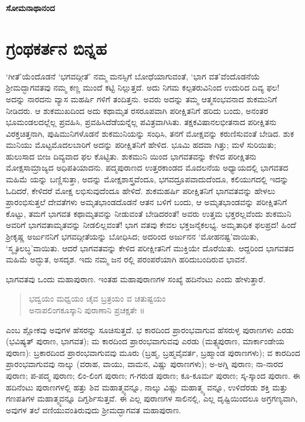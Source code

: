 \begin{flushright}
\textbf{ಸೋಮನಾಥಾನಂದ}
\end{flushright}

\chapter*{ಗ್ರಂಥಕರ್ತನ ಬಿನ್ನಹ}

‘ಗೀತೆ’ಯೆಂದೊಡನೆ ‘ಭಗವದ್ಗೀತೆ’ ನಮ್ಮ ಮನಸ್ಸಿಗೆ ಬೋಧೆಯಾಗುವಂತೆ, ‘ಭಾಗ ವತ’ವೆಂದೊಡನೆಯೆ ಶ್ರೀಮದ್ಭಾಗವತವು ನಮ್ಮ ಕಣ್ಣ ಮುಂದೆ ಕಟ್ಟಿ ನಿಲ್ಲುತ್ತದೆ. ಅದು ನಿಗಮ ಕಲ್ಪತರುವಿನಿಂದ ಉದುರಿದ ದಿವ್ಯ ಫಲ! ಅದನ್ನು ನಾರದನು ವ್ಯಾಸ ಮಹರ್ಷಿ ಗಳಿಗೆ ತಂದಿತ್ತನು. ಅವರು ಅದನ್ನು ತಮ್ಮ ಆತ್ಮಸಂಭವನಾದ ಶುಕಮುನಿಗೆ ನೀಡಿದರು. ಆ ಶುಕಮುಖದಿಂದ ಅದು ಕಥಾಮೃತ ರಸರೂಪವಾಗಿ ಪರೀಕ್ಷಿತನಿಗೆ ಹರಿದು ಬಂದು, ಅನಂತರ ಭೂಮಂಡಲದಲ್ಲೆಲ್ಲ ಪ್ರವಹಿಸಿ, ಪ್ರವಹಿಸಿದೆಡೆಯನ್ನೆಲ್ಲ ಪವಿತ್ರವಾಗಿಸಿತು. ತಕ್ಷಕವಿಷಾನಲಭೀತನಾದ ಪರೀಕ್ಷಿತನು ವಿರಕ್ತಚಿತ್ತನಾಗಿ, ಪುಷಿಮುನಿಗಳೊಡನೆ ಶುಕಮುನಿಯನ್ನು ಸಂಧಿಸಿ, ತನಗೆ ಮೋಕ್ಷವನ್ನು ಕರುಣಿಸುವಂತೆ ಬೇಡಿದ. ಶುಕ ಮುನಿಯು ಮೊಟ್ಟಮೊದಲಬಾರಿಗೆ ಅದನ್ನು ಪರೀಕ್ಷಿತನಿಗೆ ಹೇಳಿದ. ಭೂಮಿ ಹದವಾ ಗಿತ್ತು; ಮಳೆ ಸುರಿಯಿತು; ಹುಲುಸಾದ ಬೀಜ ದಿವ್ಯವಾದ ಫಲ ಕೊಟ್ಟಿತು. ಶುಕಮುನಿ ಯಿಂದ ಭಾಗವತವನ್ನು ಕೇಳಿದ ಪರೀಕ್ಷಿತನು ಮೋಕ್ಷಸಾಮ್ರಾಜ್ಯದ ಅಧಿಪತಿಯಾದನು. ಪದ್ಮಪುರಾಣದ ಉತ್ತರಕಾಂಡದ ಮೊದಲನೆಯ ಅಧ್ಯಾಯದಲ್ಲಿ ಭಾಗವತದ ಮಹಿಮೆ ಯನ್ನು ಬಣ್ಣಿಸುತ್ತಾ, ಅದನ್ನು ಮೋಕ್ಷಶಾಸ್ತ್ರವೆಂದೂ, ಭಗವದ್ರೂಪವಾದುದೆಂದೂ, ಕಲಿಯುಗದಲ್ಲಿ ಇದನ್ನು ಓದಿದರೆ, ಕೇಳಿದರೆ ಮೋಕ್ಷ ಲಭಿಸುವುದೆಂದೂ ಹೇಳಿದೆ. ಶುಕಮಹರ್ಷಿ ಪರೀಕ್ಷಿತನಿಗೆ ಭಾಗವತವನ್ನು ಹೇಳಲು ಪ್ರಾರಂಭಿಸುತ್ತಲೆ ದೇವತೆಗಳು ಅಮೃತಭಾಂಡದೊಡನೆ ಆತನ ಬಳಿಗೆ ಬಂದು, ಆ ಅಮೃತಭಾಂಡವನ್ನು ಪರೀಕ್ಷಿತನಿಗೆ ಕೊಟ್ಟು, ತಮಗೆ ಭಾಗವತ ಕಥಾಮೃತವನ್ನು ನೀಡುವಂತೆ ಬೇಡಿದರಂತೆ! ಅವರು ಉತ್ತಮ ಭಕ್ತರಲ್ಲವೆಂದು ಶುಕಮುನಿ ಅವರಿಗೆ ಭಾಗವತಾಮೃತವನ್ನು ನೀಡಲಿಲ್ಲವಂತೆ! ಭಾಗ ವತವು ಕೇವಲ ಭಕ್ತಜನೈಕಲಭ್ಯ. ಅಮೃತಾಧಿಕ ಫಲಪ್ರದ! ಹಿಂದೆ ಶ್ರೀಕೃಷ್ಣ ಅರ್ಜುನನಿಗೆ ಭಗವದ್ಗೀತೆಯನ್ನು ಬೋಧಿಸಿದ; ಅದರಿಂದ ಅರ್ಜುನನ ‘ಮೋಹನಷ್ಟ’ವಾಯಿತು, ‘ಸ್ಮೃತಿಲಬ್ಧ’ವಾಯಿತು. ಆದರೆ ಭಾಗವತವನ್ನು ಕೇಳಿದ ಪರೀಕ್ಷೀತನಿಗೆ ಮುಕ್ತಿಯೇ ದೊರೆಯಿತು. ಆದ್ದರಿಂದ ಭಾಗವತದ ಮಹಿಮೆ ಅದ್ಭುತ, ಅಸದೃಶ. ಇದು ನಮ್ಮ ಜನ ರಲ್ಲಿ ಪರಂಪರೆಯಾಗಿ ಹರಿದುಬಂದಿರುವ ಭಾವನೆ.

ಭಾಗವತವು ಒಂದು ಮಹಾಪುರಾಣ. ಇಂತಹ ಮಹಾಪುರಾಣಗಳ ಸಂಖ್ಯೆ ಹದಿನೆಂಟು ಎಂದು ಹೇಳುತ್ತಾರೆ.

\begin{verse}
ಭದ್ವಯಂ ಮಧ್ವಯಂ ಚೈವ ಬ್ರತ್ರಯಂ ವ ಚತುಷ್ಟಯಂ\\ಅನಾಪಲಿಂಗಕೂಸ್ಕಾನಿ ಪುರಾಣಾನಿ ಪ್ರಚಕ್ಷತೇ ॥
\end{verse}

ಎಂಬ ಶ್ಲೋಕವು ಅವುಗಳ ಹೆಸರನ್ನು ಸೂಚಿಸುತ್ತದೆ. ಭ ಕಾರದಿಂದ ಪ್ರಾರಂಭವಾಗುವ ಹೆಸರುಳ್ಳ ಪುರಾಣಗಳು ಎರಡು (ಭವಿಷ್ಯತ್ ಪುರಾಣ, ಭಾಗವತ); ಮ ಕಾರದಿಂದ ಪ್ರಾರಂಭವಾಗುವವು ಎರಡು (ಮತ್ಸ್ಯಪುರಾಣ, ಮಾರ್ಕಾಂಡೇಯ ಪುರಾಣ): ಬ್ರಕಾರದಿಂದ ಪ್ರಾರಂಭವಾಗುವವು ಮೂರು (ಬ್ರಹ್ಮ, ಬ್ರಹ್ಮವೈವರ್ತ, ಬ್ರಹ್ಮಾಂಡ ಪುರಾಣಗಳು); ವ ಕಾರದಿಂದ ಪ್ರಾರಂಭವಾಗುವವು ನಾಲ್ಕು (ವರಾಹ, ವಾಯು, ವಾಮನ, ವಿಷ್ಣು ಪುರಾಣಗಳು); ಅ-ಅಗ್ನಿ ಪುರಾಣ; ನಾ-ನಾರದ ಪುರಾಣ; ಪ-ಪದ್ಮ ಪುರಾಣ; ಲಿಂ-ಲಿಂಗ ಪುರಾಣ; ಗ-ಗರುಡ ಪುರಾಣ; ಕೂ-ಕೂರ್ಮ ಪುರಾಣ; ಸ್ಕ-ಸ್ಕಾಂದ ಪುರಾಣ. ಈ ಹದಿನೆಂಟು ಪುರಾಣಗಳಲ್ಲಿ ಹತ್ತು ಶಿವ ಮಹಾತ್ಮ್ಯವನ್ನೂ, ನಾಲ್ಕು ವಿಷ್ಣು ಮಹಾತ್ಮ್ಯ ವನ್ನೂ, ಉಳಿದೆರಡು ಶಕ್ತಿ ಮತ್ತು ಗಣಪತಿಗಳ ಮಹಾತ್ಮ್ಯವನ್ನೂ ದಿಗ್ದರ್ಶಿಸುತ್ತವೆ. ಈ ಎಲ್ಲ ಪುರಾಣಗಳ ಸಾಲಿನಲ್ಲಿ, ಎಲ್ಲ ದೃಷ್ಟಿಯಿಂದಲೂ ಅಗ್ರಗಣ್ಯವಾಗಿ, ಅವುಗಳ ತಲೆ ವಣಿಯುವಂತಿರುವುದು ಶ್ರೀಮದ್ಭಾಗವತ ಮಹಾಪುರಾಣ.

